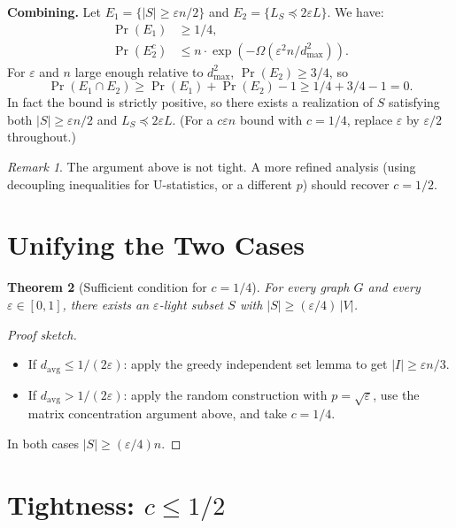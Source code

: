 \documentclass[12pt]{article}
\newtheorem{theorem}{Theorem}
\theoremstyle{definition}
\theoremstyle{remark}
\newtheorem{remark}[theorem]{Remark}
\begin{document}
\textbf{Combining.}  Let $E_1 = \{|S| \ge \varepsilon n/2\}$ and $E_2 = \{L_S \preceq 2\varepsilon L\}$.  We have:
\begin{align*}
  \Pr(E_1) &\ge 1/4,\\
  \Pr(E_2^c) &\le n \cdot \exp(-\Omega(\varepsilon^2 n / d_{\max}^2)).
\end{align*}
For $\varepsilon$ and $n$ large enough relative to $d_{\max}^2$, $\Pr(E_2) \ge 3/4$, so
\[
  \Pr(E_1 \cap E_2) \ge \Pr(E_1) + \Pr(E_2) - 1 \ge 1/4 + 3/4 - 1 = 0.
\]
In fact the bound is strictly positive, so there exists a realization of $S$ satisfying both $|S| \ge \varepsilon n/2$ and $L_S \preceq 2\varepsilon L$.  (For a $c\varepsilon n$ bound with $c = 1/4$, replace $\varepsilon$ by $\varepsilon/2$ throughout.)

\begin{remark}
The argument above is not tight.  A more refined analysis (using decoupling inequalities for U-statistics, or a different $p$) should recover $c = 1/2$.
\end{remark}

\section{Unifying the Two Cases}

\begin{theorem}[Sufficient condition for $c = 1/4$]\label{thm:c14}
For every graph $G$ and every $\varepsilon \in [0,1]$, there exists an $\varepsilon$-light subset $S$ with $|S| \ge (\varepsilon/4)\,|V|$.
\end{theorem}

\begin{proof}[Proof sketch]
\begin{itemize}
\item If $d_{\mathrm{avg}} \le 1/(2\varepsilon)$: apply the greedy independent set lemma to get $|I| \ge \varepsilon n / 3$.
\item If $d_{\mathrm{avg}} > 1/(2\varepsilon)$: apply the random construction with $p = \sqrt{\varepsilon}$, use the matrix concentration argument above, and take $c = 1/4$.
\end{itemize}
In both cases $|S| \ge (\varepsilon/4) n$.
\end{proof}

\section{Tightness: \texorpdfstring{$c \le 1/2$}{c <= 1/2}}
\end{document}
